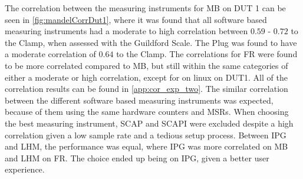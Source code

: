 The correlation between the measuring instruments for MB on DUT 1 can be seen in \cref{fig:mandelCorrDut1}, where it was found that all software based measuring instruments had a moderate to high correlation between $0.59$ - $0.72$ to the Clamp, when assessed with the Guildford Scale. The Plug was found to have a moderate correlation of $0.64$ to the Clamp. The correlations for FR were found to be more correlated compared to MB, but still within the same categories of either a moderate or high correlation, except for on linux on DUT1. All of the correlation results can be found in \cref{app:cor_exp_two}. The similar correlation between the different software based measuring instruments was expected, because of them using the same hardware counters and MSRs. When choosing the best measuring instrument, SCAP and SCAPI were excluded despite a high correlation given a low sample rate and a tedious setup process. Between IPG and LHM, the performance was equal, where IPG was more correlated on MB and LHM on FR. The choice ended up being on IPG, given a better user experience. 


